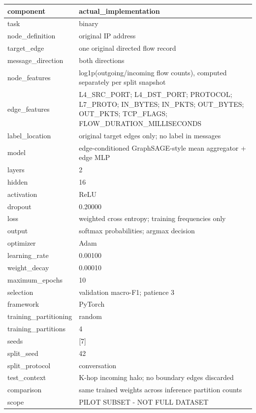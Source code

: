 \begin{tabular}{ll}
\toprule
component & actual\_implementation \\
\midrule
task & binary \\
node\_definition & original IP address \\
target\_edge & one original directed flow record \\
message\_direction & both directions \\
node\_features & log1p(outgoing/incoming flow counts), computed separately per split snapshot \\
edge\_features & L4\_SRC\_PORT; L4\_DST\_PORT; PROTOCOL; L7\_PROTO; IN\_BYTES; IN\_PKTS; OUT\_BYTES; OUT\_PKTS; TCP\_FLAGS; FLOW\_DURATION\_MILLISECONDS \\
label\_location & original target edges only; no label in messages \\
model & edge-conditioned GraphSAGE-style mean aggregator + edge MLP \\
layers & 2 \\
hidden & 16 \\
activation & ReLU \\
dropout & 0.20000 \\
loss & weighted cross entropy; training frequencies only \\
output & softmax probabilities; argmax decision \\
optimizer & Adam \\
learning\_rate & 0.00100 \\
weight\_decay & 0.00010 \\
maximum\_epochs & 10 \\
selection & validation macro-F1; patience 3 \\
framework & PyTorch \\
training\_partitioning & random \\
training\_partitions & 4 \\
seeds & [7] \\
split\_seed & 42 \\
split\_protocol & conversation \\
test\_context & K-hop incoming halo; no boundary edges discarded \\
comparison & same trained weights across inference partition counts \\
scope & PILOT SUBSET - NOT FULL DATASET \\
\bottomrule
\end{tabular}
